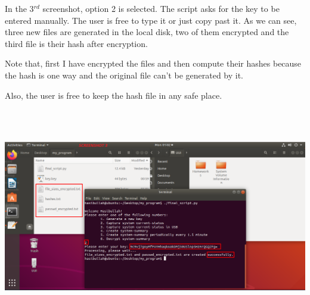 \documentclass{article} %
\begin{document}
\noindent 

\noindent 

\noindent 

\noindent 

\noindent 

\noindent 

\noindent 

\noindent 

\noindent 

\noindent 

\noindent 

\noindent 

\noindent 

\noindent \newline\newline \newline\newline\newline \newline\newline\newline \newline\newline\newline \newline\newline\newline\newline \newline\newline\newline\newline In the 3${}^{rd}$ screenshot, option 2 is selected. The script asks for the key to be entered manually. The user is free to type it or just copy past it. As we can see, three new files are generated in the local disk, two of them encrypted and the third file is their hash after encryption.\newline

\noindent Note that, first I have encrypted the files and then compute their hashes because the hash is one way and the original file can't be generated by it.\newline

\noindent Also, the user is free to keep the hash file in any safe place.

\noindent \includegraphics*[width=6in, height=3.73in, keepaspectratio=false]{3.png}
\end{document}
